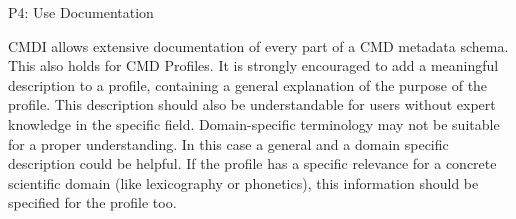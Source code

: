 P4: Use Documentation

 

CMDI allows extensive documentation of every part of a CMD metadata schema. This also holds for CMD Profiles. It is strongly encouraged to add a meaningful description to a profile, containing a general explanation of the purpose of the profile. This description should also be understandable for users without expert knowledge in the specific field. Domain-specific terminology may not be suitable for a proper
understanding. In this case a general and a domain specific description could be helpful. If the profile has a specific relevance for a concrete scientific domain (like lexicography or phonetics), this information should be specified for the profile too.

